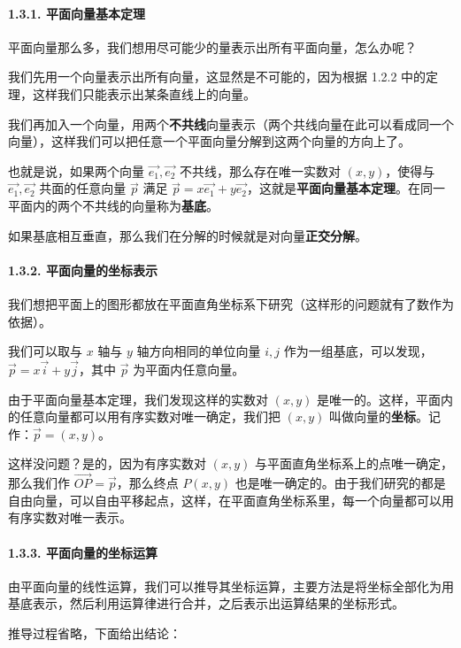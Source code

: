 \paragraph{1.3.1. 平面向量基本定理}

平面向量那么多，我们想用尽可能少的量表示出所有平面向量，怎么办呢？

我们先用一个向量表示出所有向量，这显然是不可能的，因为根据 1.2.2 中的定理，这样我们只能表示出某条直线上的向量。

我们再加入一个向量，用两个\textbf{不共线}向量表示（两个共线向量在此可以看成同一个向量），这样我们可以把任意一个平面向量分解到这两个向量的方向上了。

也就是说，如果两个向量 $\vec{e_1},\vec{e_2}$ 不共线，那么存在唯一实数对 $(x,y)$，使得与 $\vec{e_1},\vec{e_2}$ 共面的任意向量 $\vec p$ 满足 $\vec p=x\vec{e_1}+y\vec{e_2}$，这就是\textbf{平面向量基本定理}。在同一平面内的两个不共线的向量称为\textbf{基底}。

如果基底相互垂直，那么我们在分解的时候就是对向量\textbf{正交分解}。

\paragraph{1.3.2. 平面向量的坐标表示}

我们想把平面上的图形都放在平面直角坐标系下研究（这样形的问题就有了数作为依据）。

我们可以取与 $x$ 轴与 $y$ 轴方向相同的单位向量 $i,j$ 作为一组基底，可以发现，$\vec p=x\vec i+y\vec j$，其中 $\vec p$ 为平面内任意向量。

由于平面向量基本定理，我们发现这样的实数对 $(x,y)$ 是唯一的。这样，平面内的任意向量都可以用有序实数对唯一确定，我们把 $(x,y)$ 叫做向量的\textbf{坐标}。记作：$\vec p=(x,y)$。

这样没问题？是的，因为有序实数对 $(x,y)$ 与平面直角坐标系上的点唯一确定，那么我们作 $\vec{OP}=\vec p$，那么终点 $P(x,y)$ 也是唯一确定的。由于我们研究的都是自由向量，可以自由平移起点，这样，在平面直角坐标系里，每一个向量都可以用有序实数对唯一表示。

\paragraph{1.3.3. 平面向量的坐标运算}

由平面向量的线性运算，我们可以推导其坐标运算，主要方法是将坐标全部化为用基底表示，然后利用运算律进行合并，之后表示出运算结果的坐标形式。

推导过程省略，下面给出结论：

